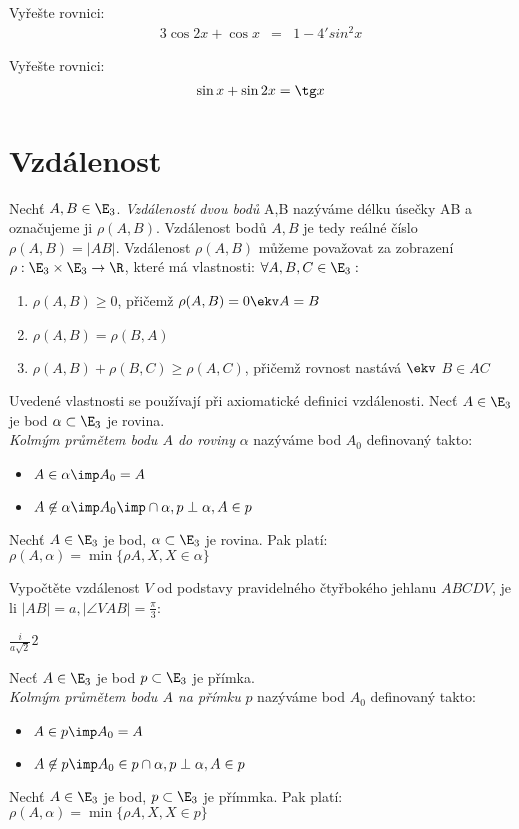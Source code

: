 
\let\braceru=\relax \let\bracelu=\relax 
\def\o#1{\setbox0=
	\hbox{$\kern2pt\overbrace{\kern-2pt#1\kern-2pt}\kern2pt$}\ht0=2.1ex\box0}
\def\to#1{\hbox{#1\rlap{\t{}}}}
\def\rad{\rm{rad}}
\def\f{\frac}

\Pr Vyřešte rovnici:
\begin{eqnarray*}
	3 \cos 2x + \cos x &=& 1-4'sin^2 x
\end{eqnarray*}

\Pr Vyřešte rovnici:
\begin{eqnarray*}
	\sin x + \sin 2x = \tg x
\end{eqnarray*}
\section{Vzdálenost}
\Def Nechť $A,B \in \E_3$. \emph{Vzdáleností dvou bodů} A,B nazýváme délku úsečky AB a označujeme ji $\rho(A,B)$.
\Poz
Vzdálenost bodů $A,B$ je tedy reálné číslo $\rho(A,B) = |AB|$.
\Poz
Vzdálenost $\rho(A,B)$ můžeme považovat za zobrazení $\rho: \E_3\times\E_3 \rightarrow \R$, které má vlastnosti:
$\forall A,B,C \in \E_3:$
\begin{enumerate}
	\item $\rho(A,B) \ge 0$, přičemž $\rho(A,B) = 0 \ekv A=B$
	\item $\rho(A,B)=\rho(B,A)$
	\item $\rho(A,B) + \rho(B,C) \ge \rho(A,C)$, přičemž rovnost nastává $\ekv$ $B\in AC$
\end{enumerate}
\Poz Uvedené vlastnosti se používají při axiomatické definici vzdálenosti.
\Def
Necť $A\in\E_3$ je bod $\alpha\subset \E_3$ je rovina.\\
\emph{Kolmým průmětem bodu $A$ do roviny} $\alpha$ nazýváme bod $A_0$ definovaný takto:
\begin{itemize}
\item $A\in\alpha \imp A_0=A$
\item $A\not\in\alpha \imp A_0\imp\cap\alpha, p\perp\alpha , A\in p$
\end{itemize}
\V Nechť $A\in\E_3$ je bod, $\alpha\subset\E_3$ je rovina. Pak platí:
$\rho (A,\alpha) = \min\{\rho{A,X},X\in\alpha\}$

\Pr Vypočtěte vzdálenost $V$ od podstavy pravidelného čtyřbokého jehlanu $ABCDV$, je li $|AB|=a, |\angle VAB| = \f \pi 3$:

$\f i{a\sqrt 2} 2 $

\Def
Necť $A\in\E_3$ je bod $p\subset \E_3$ je přímka.\\
\emph{Kolmým průmětem bodu $A$ na přímku} $p$ nazýváme bod $A_0$ definovaný takto:
\begin{itemize}
\item $A\in p \imp A_0=A$
\item $A\not\in p \imp A_0\in p\cap\alpha, p\perp\alpha , A\in p$
\end{itemize}
\V Nechť $A\in\E_3$ je bod, $p \subset\E_3$ je přímmka. Pak platí:
$\rho (A,\alpha) = \min\{\rho{A,X},X\in p\}$

